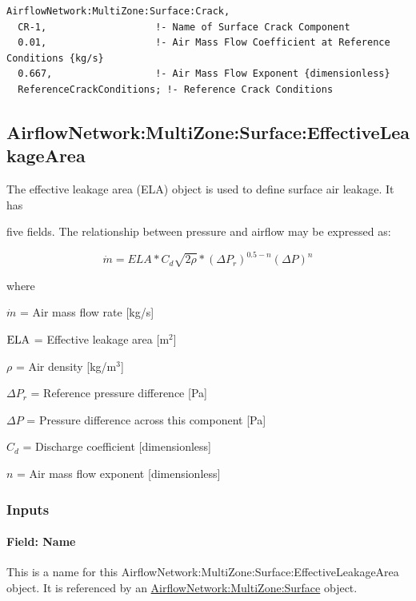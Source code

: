\begin{lstlisting}
AirflowNetwork:MultiZone:Surface:Crack,
  CR-1,                   !- Name of Surface Crack Component
  0.01,                   !- Air Mass Flow Coefficient at Reference Conditions {kg/s}
  0.667,                  !- Air Mass Flow Exponent {dimensionless}
  ReferenceCrackConditions; !- Reference Crack Conditions
\end{lstlisting}

\subsection{AirflowNetwork:MultiZone:Surface:EffectiveLeakageArea}\label{airflownetworkmultizonesurfaceeffectiveleakagearea}

The effective leakage area (ELA) object is used to define surface air leakage. It has

five fields. The relationship between pressure and airflow may be expressed as:

\begin{equation}
\dot m = ELA*{C_d}\sqrt {2\rho } *{\left( {\Delta {P_r}} \right)^{0.5 - n}}{\left( {\Delta P} \right)^n}
\end{equation}

where

\(\dot m\) = Air mass flow rate {[}kg/s{]}

\(\rm{ELA}\) = Effective leakage area {[}m\(^{2}\){]}

\(\rho\) = Air density {[}kg/m\(^{3}\){]}

\(\Delta {P_r}\) = Reference pressure difference {[}Pa{]}

\(\Delta P\) = Pressure difference across this component {[}Pa{]}

\(C_{d}\) = Discharge coefficient {[}dimensionless{]}

\(n\) = Air mass flow exponent {[}dimensionless{]}

\subsubsection{Inputs}\label{inputs-3-003}

\paragraph{Field: Name}\label{field-name-3-003}

This is a name for this AirflowNetwork:MultiZone:Surface:EffectiveLeakageArea object. It is referenced by an \hyperref[airflownetworkmultizonesurface]{AirflowNetwork:MultiZone:Surface} object.

